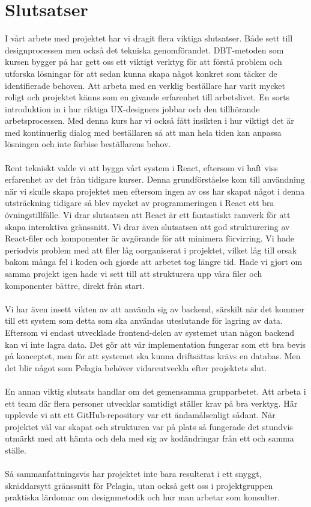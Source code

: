 \section{Slutsatser}
I vårt arbete med projektet har vi dragit flera viktiga slutsatser. Både sett till designprocessen men också det tekniska genomförandet. DBT-metoden som kursen bygger på har gett oss ett viktigt verktyg för att förstå problem och utforska lösningar för att sedan kunna skapa något konkret som täcker de identifierade behoven. Att arbeta med en verklig beställare har varit mycket roligt och projektet känns som en givande erfarenhet till arbetslivet. En sorts introduktion in i hur riktiga UX-designers jobbar och den tillhörande arbetsprocessen. Med denna kurs har vi också fått insikten i hur viktigt det är med kontinuerlig dialog med beställaren så att man hela tiden kan anpassa lösningen och inte förbise beställarens behov.
\\
\\
Rent tekniskt valde vi att bygga vårt system i React, eftersom vi haft viss erfarenhet av det från tidigare kurser. Denna grundförståelse kom till användning när vi skulle skapa projektet men eftersom ingen av oss har skapat något i denna utsträckning tidigare så blev mycket av programmeringen i React ett bra övningstillfälle. Vi drar slutsatsen att React är ett fantastiskt ramverk för att skapa interaktiva gränssnitt. Vi drar även slutsatsen att god strukturering av React-filer och komponenter är avgörande för att minimera förvirring. Vi hade periodvis problem med att filer låg oorganiserat i projektet, vilket låg till orsak bakom många fel i koden och gjorde att arbetet tog längre tid. Hade vi gjort om samma projekt igen hade vi sett till att strukturera upp våra filer och komponenter bättre, direkt från start.
\\
\\
Vi har även insett vikten av att använda sig av backend, särskilt när det kommer till ett system som detta som ska användas uteslutande för lagring av data. Eftersom vi endast utvecklade frontend-delen av systemet utan någon backend kan vi inte lagra data.  
Det gör att vår implementation fungerar som ett bra bevis på konceptet, men för att systemet ska kunna driftsättas krävs en databas. Men det blir något som Pelagia behöver vidareutveckla efter projektets slut.
\\
\\
En annan viktig slutsats handlar om det gemensamma grupparbetet. Att arbeta i ett team där flera personer utvecklar samtidigt ställer krav på bra verktyg. Här upplevde vi att ett GitHub-repository var ett ändamålsenligt sådant. När projektet väl var skapat och strukturen var på plats så fungerade det stundvis utmärkt med att hämta och dela med sig av kodändringar från ett och samma ställe.
\\
\\
Så sammanfattningsvis har projektet inte bara resulterat i ett snyggt, skräddarsytt gränssnitt för Pelagia, utan också gett oss i projektgruppen praktiska lärdomar om designmetodik och hur man arbetar som konsulter.
